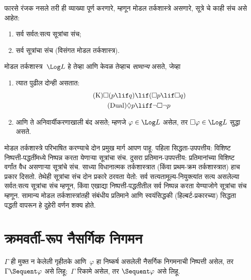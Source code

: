 \begin{ex}
फारसे रंजक नसले तरी ही व्याख्या पूर्ण करणारे,
म्हणून मोडल तर्कशास्त्रे असणारे, सूत्रे
चे काही संच असे आहेत:
\begin{enumerate}
\item सर्व सर्वत:सत्य सूत्रांचा संच;
\item सर्व सूत्रांचा संच (विसंगत मोडल तर्कशास्त्र).
\end{enumerate}
\end{ex}

\begin{defn}\label{defn:normal-modal-logic}
मोडल तर्कशास्त्र~$\Log L$ हे तेव्हा आणि केवळ
तेव्हाच \emph{सामान्य} असते, जेव्हा
\begin{enumerate}
\item त्यात पुढील दोन्ही असतात:
\begin{align}
\tag{K} \Box(p \lif q) & \lif (\Box p \lif \Box q) \\
\tag{Dual} \Diamond p & \liff \lnot \Box \lnot p
\end{align}
\item आणि ते अनिवार्यीकरणाखाली बंद असते; म्हणजे
  $\varphi \in \Log L$ असेल, तर
  $\Box \varphi \in \Log L$ सुद्धा असते.
\end{enumerate}
\end{defn}

मोडल तर्कशास्त्रे परिभाषित करण्याचे दोन प्रमुख
मार्ग आपण पाहू. पहिला सिद्धता-उपपत्तीय: विशिष्ट
निष्पत्ती-पद्धतींमध्ये निष्पन्न करता येणाऱ्या
सूत्रांचा संच. दुसरा प्रतिमान-उपपत्तीय:
प्रतिमानांच्या विशिष्ट वर्गांत वैध असणाऱ्या
सूत्रांचे संच. साध्या विधानात्मक तर्कशास्त्रात
(किंवा प्रथम-क्रम तर्कशास्त्रात) हाच प्रकार दिसतो.
तेथेही सूत्रांचा संच दोन प्रकारे ठरवता येतो:
सर्व सत्यतामूल्य-नियुक्त्यांत सत्य असलेल्या
सर्वत:सत्य सूत्रांचा संच म्हणून, किंवा एखाद्या
निष्पत्ती-पद्धतीतील सर्व निष्पन्न करता येण्याजोगे
सूत्रांचा संच म्हणून. सामान्य मोडल
तर्कशास्त्रांतही संबंधीय प्रतिमाने आणि स्वयंसिद्धकी
(हिल्बर्ट-प्रकारच्या) सिद्धता पद्धती वापरून हे
दुहेरी वर्णन शक्य होते.












\section{क्रमवर्ती-रूप नैसर्गिक निगमन}\label{int:pty:snd:sec}

$\Gamma$ ही मुक्त न केलेली गृहीतके आणि~$\varphi$ हा
निष्कर्ष असलेली नैसर्गिक निगमनाची निष्पत्ती असेल,
तर $\Gamma \Sequent \varphi$ असे लिहू;~$\Gamma$ रिकामे
असेल, तर $\Sequent \varphi$ असे लिहू.

